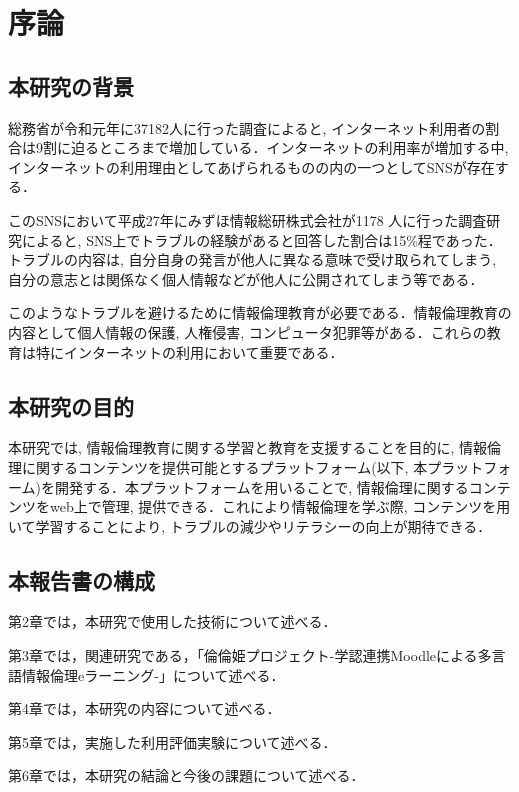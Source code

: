 \section{序論}\label{sec1}
\subsection{本研究の背景}

総務省が令和元年に37182人に行った調査によると, インターネット利用者の割合は9割に迫るところまで増加している\cite{soumu}．インターネットの利用率が増加する中, インターネットの利用理由としてあげられるものの内の一つとしてSNSが存在する．
  
このSNSにおいて平成27年にみずほ情報総研株式会社が1178 人に行った調査研究\cite{mizuho}によると, SNS上でトラブルの経験があると回答した割合は15\%程であった．トラブルの内容は, 自分自身の発言が他人に異なる意味で受け取られてしまう, 自分の意志とは関係なく個人情報などが他人に公開されてしまう等である．

このようなトラブルを避けるために情報倫理教育が必要である．情報倫理教育の内容として個人情報の保護, 人権侵害, コンピュータ犯罪等がある．これらの教育は特にインターネットの利用において重要である\cite{moraru}．

\subsection{本研究の目的}

本研究では, 情報倫理教育に関する学習と教育を支援することを目的に, 情報倫理に関するコンテンツを提供可能とするプラットフォーム(以下, 本プラットフォーム)を開発する．本プラットフォームを用いることで, 情報倫理に関するコンテンツをweb上で管理, 提供できる．これにより情報倫理を学ぶ際, コンテンツを用いて学習することにより, トラブルの減少やリテラシーの向上が期待できる．

\subsection{本報告書の構成}

第2章では，本研究で使用した技術について述べる．

第3章では，関連研究である，「倫倫姫プロジェクト-学認連携Moodleによる多言語情報倫理eラーニング-\cite{rinri}」について述べる．

第4章では，本研究の内容について述べる．

第5章では，実施した利用評価実験について述べる．

第6章では，本研究の結論と今後の課題について述べる．
